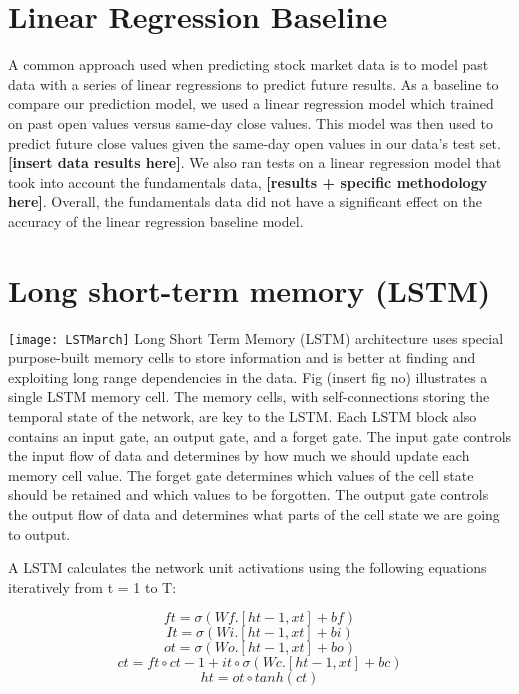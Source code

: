 \documentclass{article}
\begin{document}
\section{Linear Regression Baseline}
\label{sec:linear_regression}
A common approach used when predicting stock market data is to model past data with a series of linear regressions to predict future results. As a baseline to compare our prediction model, we used a linear regression model which trained on past open values versus same-day close values. This model was then used to predict future close values given the same-day open values in our data’s test set. \textbf{[insert data results here]}. We also ran tests on a linear regression model that took into account the fundamentals data, \textbf{[results + specific methodology here]}. Overall, the fundamentals data did not have a significant effect on the accuracy of the linear regression baseline model. 

\section{Long short-term memory (LSTM)}
\label{sec:lstm}
\texttt{[image: LSTMarch]}
Long Short Term Memory (LSTM) architecture\cite{hochreiter_schmidhuber_1997} uses special purpose-built memory cells to store information and is better at finding and exploiting long range dependencies in the data. Fig (insert fig no) illustrates a single LSTM memory cell. The memory cells, with self-connections storing the temporal state of the network, are key to the LSTM. Each LSTM block also contains an input gate, an output gate, and a forget gate. The input gate controls the input flow of data and determines by how much we should update each memory cell value. The forget gate determines which values of the cell state should be retained and which values to be forgotten. The output gate controls the output flow of data and determines what parts of the cell state we are going to output.

A LSTM calculates the network unit activations using the following equations iteratively from t = 1 to T:

\begin{equation}
ft  = \sigma ( Wf.[ht-1, xt] + bf)
\end{equation}
\begin{equation}
It  = \sigma ( Wi.[ht-1, xt] + bi)
\end{equation}
\begin{equation}
ot  = \sigma ( Wo.[ht-1, xt] + bo)
\end{equation}
\begin{equation}
ct = ft \circ ct-1  +  it \circ\sigma ( Wc.[ht-1, xt] + bc)
\end{equation}
\begin{equation}
ht = ot \circ tanh(ct)
\end{equation}
\end{document}
